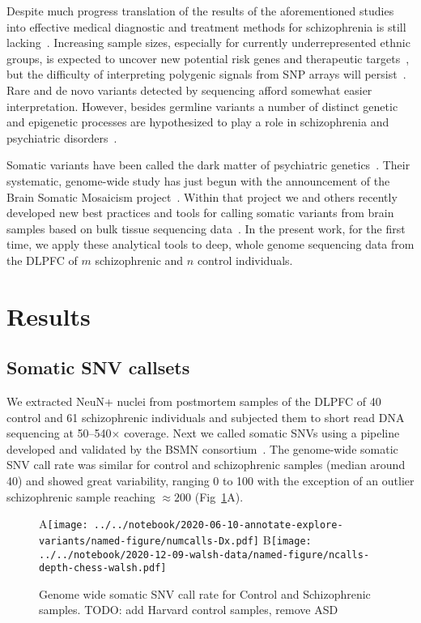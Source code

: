 \documentclass[letterpaper]{article}
\begin{document}
Despite much progress translation of the results of the aforementioned studies
into effective medical diagnostic and treatment methods for schizophrenia is
still lacking~\citep{Breen2016,Foley2017}. Increasing sample sizes, especially
for currently underrepresented ethnic groups, is expected to uncover new
potential risk genes and therapeutic targets~\citep{Visscher2017}, but the difficulty of interpreting
polygenic signals from SNP arrays will persist~\citep{Boyle2017}.  Rare and de
novo variants detected by sequencing afford somewhat easier interpretation.
However, besides germline variants a number of distinct genetic and epigenetic
processes are hypothesized to play a role in schizophrenia and psychiatric
disorders~\citep{PsychENCODEConsortium2015}.

Somatic variants have been called the dark matter of psychiatric
genetics~\citep{Insel2014}.  Their systematic, genome-wide study has just begun
with the announcement of the Brain Somatic Mosaicism
project~\citep{McConnell2017}.  Within that project we and others recently
developed new best practices and tools for calling somatic variants from brain
samples based on bulk tissue sequencing data~\citep{Wang2021}.  In the present
work, for the first time, we apply these analytical tools to deep, whole
genome sequencing data from the DLPFC of \(m\) schizophrenic and \(n\) control
individuals.

\section*{Results}

\subsection*{Somatic SNV callsets}

We extracted NeuN+ nuclei from postmortem samples of the DLPFC of 40 control
and 61 schizophrenic individuals and subjected them to short read DNA
sequencing at 50--540\(\times\) coverage.  Next we called somatic SNVs using a
pipeline developed and validated by the BSMN consortium~\citep{Wang2021}.  The
genome-wide somatic SNV call rate was similar for control and schizophrenic
samples (median around 40) and showed great variability, ranging 0 to 100 with
the exception of an outlier schizophrenic sample reaching \(\approx 200\)
(Fig~\ref{fig:genomewide-calls}A).

\begin{figure}
A\texttt{[image: ../../notebook/2020-06-10-annotate-explore-variants/named-figure/numcalls-Dx.pdf]}
B\texttt{[image: ../../notebook/2020-12-09-walsh-data/named-figure/ncalls-depth-chess-walsh.pdf]}
\caption{Genome wide somatic SNV call rate for Control and Schizophrenic samples.  TODO:
	add Harvard control samples, remove ASD}
\label{fig:genomewide-calls}
\end{figure}
\end{document}
